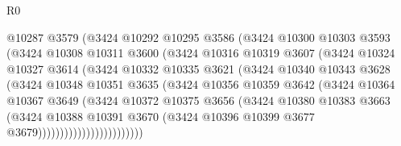 \begin{lexlean}{R0}
\begin{coremodule}
                        @10287
                        @3579
                        (@3424
                          @10292
                          @10295
                          @3586
                          (@3424
                            @10300
                            @10303
                            @3593
                            (@3424
                              @10308
                              @10311
                              @3600
                              (@3424
                                @10316
                                @10319
                                @3607
                                (@3424
                                  @10324
                                  @10327
                                  @3614
                                  (@3424
                                    @10332
                                    @10335
                                    @3621
                                    (@3424
                                      @10340
                                      @10343
                                      @3628
                                      (@3424
                                        @10348
                                        @10351
                                        @3635
                                        (@3424
                                          @10356
                                          @10359
                                          @3642
                                          (@3424
                                            @10364
                                            @10367
                                            @3649
                                            (@3424
                                              @10372
                                              @10375
                                              @3656
                                              (@3424
                                                @10380
                                                @10383
                                                @3663
                                                (@3424
                                                  @10388
                                                  @10391
                                                  @3670
                                                  (@3424
                                                    @10396
                                                    @10399
                                                    @3677
                                                    @3679))))))))))))))))))))))))

\end{coremodule}
\end{lexlean}
